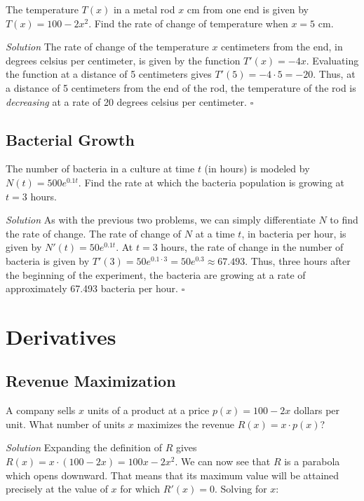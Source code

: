 \documentclass{article}
\begin{document}
The temperature \(T(x)\) in a metal rod \(x\) cm from one end is given by
\(T(x) = 100 - 2x^2\). Find the rate of change of temperature when \(x = 5\)
cm.

\textit{Solution} \: The rate of change of the temperature \(x\) centimeters
from the end, in degrees celsius per centimeter, is given by the function
\(T'(x) = -4x\). Evaluating the function at a distance of 5 centimeters gives
\(T'(5) = -4 \cdot 5 = -20\). Thus, at a distance of 5 centimeters from the end
of the rod, the temperature of the rod is \textit{decreasing} at a rate of 20
degrees celsius per centimeter. \(\square\)

\subsection{Bacterial Growth}

The number of bacteria in a culture at time \(t\) (in hours) is modeled by
\(N(t) = 500e^{0.1t}\). Find the rate at which the bacteria population is
growing at \(t = 3\) hours.

\textit{Solution} \: As with the previous two problems, we can simply
differentiate \(N\) to find the rate of change. The rate of change of \(N\) at
a time \(t\), in bacteria per hour, is given by \(N'(t) = 50e^{0.1t}\). At \(t
= 3\) hours, the rate of change in the number of bacteria is given by
\(T'(3) = 50e^{0.1 \cdot 3} = 50e^{0.3} \approx 67.493\). Thus, three hours
after the beginning of the experiment, the bacteria are growing at a rate of
approximately 67.493 bacteria per hour. \(\square\)

\section{Derivatives}

\subsection{Revenue Maximization}

A company sells \(x\) units of a product at a price \(p(x) = 100 - 2x\) dollars
per unit. What number of units \(x\) maximizes the revenue \(R(x) = x \cdot
p(x)\)?

\textit{Solution} \: Expanding the definition of \(R\) gives \(R(x) = x \cdot
(100 - 2x) = 100x - 2x^2\). We can now see that \(R\) is a parabola which opens
downward. That means that its maximum value will be attained precisely at the
value of \(x\) for which \(R'(x) = 0\). Solving for \(x\):
\end{document}
